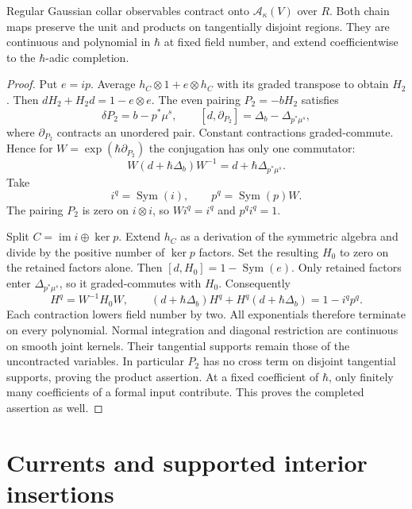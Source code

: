 \begin{theorem}\label{thm:vol2-native-quantum-collar}
Regular Gaussian collar observables contract onto
\(\mathcal A_\kappa(V)\) over \(R\). Both chain maps preserve the unit
and products on tangentially disjoint regions. They are continuous and
polynomial in \(\hbar\) at fixed field number, and extend coefficientwise
to the \(\hbar\)-adic completion.
\end{theorem}

\begin{proof}
Put \(e=ip\). Average \(h_C\otimes1+e\otimes h_C\) with its graded
transpose to obtain \(H_2\). Then
\(dH_2+H_2d=1-e\otimes e\). The even pairing \(P_2=-bH_2\) satisfies
\[
 \delta P_2=b-p^*\mu^s,
 \qquad [d,\partial_{P_2}]=\Delta_b-\Delta_{p^*\mu^s},
\]
where \(\partial_{P_2}\) contracts an unordered pair.
Constant contractions graded-commute. Hence for
\(W=\exp(\hbar\partial_{P_2})\) the conjugation has only one commutator:
\[
 W(d+\hbar\Delta_b)W^{-1}=d+\hbar\Delta_{p^*\mu^s}.
\]
Take
\begin{equation}\label{eq:vol2-native-quantum-maps}
 i^q=\operatorname{Sym}(i),\qquad
 p^q=\operatorname{Sym}(p)W.
\end{equation}
The pairing \(P_2\) is zero on \(i\otimes i\), so \(Wi^q=i^q\) and
\(p^qi^q=1\).

Split \(C=\operatorname{im}i\oplus\ker p\). Extend \(h_C\) as a derivation
of the symmetric algebra and divide by the positive number of \(\ker p\)
factors. Set the resulting \(H_0\) to zero on the retained factors alone.
Then \([d,H_0]=1-\operatorname{Sym}(e)\). Only retained factors enter
\(\Delta_{p^*\mu^s}\), so it graded-commutes with \(H_0\). Consequently
\[
 H^q=W^{-1}H_0W,
 \qquad (d+\hbar\Delta_b)H^q+H^q(d+\hbar\Delta_b)=1-i^qp^q.
\]
Each contraction lowers field number by two. All exponentials therefore
terminate on every polynomial. Normal integration and diagonal restriction
are continuous on smooth joint kernels. Their tangential supports remain
those of the uncontracted variables. In particular \(P_2\) has no cross
term on disjoint tangential supports, proving the product assertion.
At a fixed coefficient of \(\hbar\), only finitely many coefficients of a
formal input contribute. This proves the completed assertion as well.
\end{proof}

\section{Currents and supported interior insertions}

